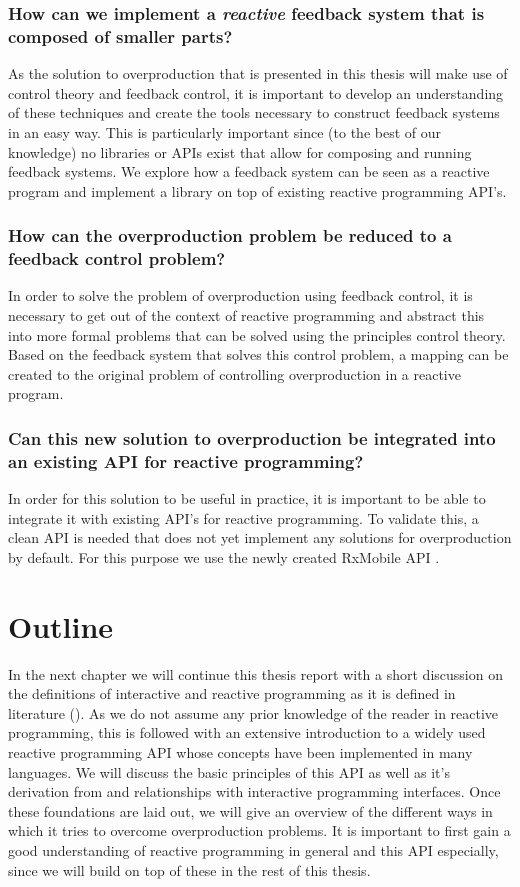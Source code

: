 \subsubsection*{How can we implement a \emph{reactive} feedback system that is composed of smaller parts?} 
As the solution to overproduction that is presented in this thesis will make use of control theory and feedback control, it is important to develop an understanding of these techniques and create the tools necessary to construct feedback systems in an easy way. This is particularly important since (to the best of our knowledge) no libraries or APIs exist that allow for composing and running feedback systems. We explore how a feedback system can be seen as a reactive program and implement a library on top of existing reactive programming API's.

\subsubsection*{How can the overproduction problem be reduced to a feedback control problem?}
In order to solve the problem of overproduction using feedback control, it is necessary to get out of the context of reactive programming and abstract this into more formal problems that can be solved using the principles control theory. Based on the feedback system that solves this control problem, a mapping can be created to the original problem of controlling overproduction in a reactive program.

\subsubsection*{Can this new solution to overproduction be integrated into an existing API for reactive programming?}
In order for this solution to be useful in practice, it is important to be able to integrate it with existing API's for reactive programming. To validate this, a clean API is needed that does not yet implement any solutions for overproduction by default. For this purpose we use the newly created RxMobile API \cite{RxMobile}.

\section*{Outline}
In the next chapter we will continue this thesis report with a short discussion on the definitions of interactive and reactive programming as it is defined in literature (). As we do not assume any prior knowledge of the reader in reactive programming, this is followed with an extensive introduction to a widely used reactive programming API whose concepts have been implemented in many languages. We will discuss the basic principles of this API as well as it's derivation from and relationships with interactive programming interfaces. Once these foundations are laid out, we will give an overview of the different ways in which it tries to overcome overproduction problems. It is important to first gain a good understanding of reactive programming in general and this API especially, since we will build on top of these in the rest of this thesis.

